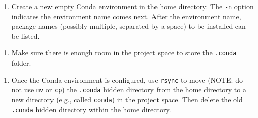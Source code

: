 \documentclass[
]{book}
\newenvironment{Shaded}{\begin{snugshade}}{\end{snugshade}}
\newcommand{\CommentTok}[1]{\textcolor[rgb]{0.56,0.35,0.01}{\textit{#1}}}
\newcommand{\DecValTok}[1]{\textcolor[rgb]{0.00,0.00,0.81}{#1}}
\newcommand{\ErrorTok}[1]{\textcolor[rgb]{0.64,0.00,0.00}{\textbf{#1}}}
\newcommand{\NormalTok}[1]{#1}
\newcommand{\OperatorTok}[1]{\textcolor[rgb]{0.81,0.36,0.00}{\textbf{#1}}}
\newcommand{\StringTok}[1]{\textcolor[rgb]{0.31,0.60,0.02}{#1}}
\providecommand{\tightlist}{%
  \setlength{\itemsep}{0pt}\setlength{\parskip}{0pt}}
\begin{document}
\begin{Shaded}
\end{Shaded}

\begin{enumerate}
\def\labelenumi{\arabic{enumi}.}
\setcounter{enumi}{2}
\tightlist
\item
  Create a new empty Conda environment in the home directory. The \texttt{-n} option indicates the environment name comes next. After the environment name, package names (possibly multiple, separated by a space) to be installed can be listed.
\end{enumerate}

\begin{Shaded}
\end{Shaded}

\begin{enumerate}
\def\labelenumi{\arabic{enumi}.}
\setcounter{enumi}{3}
\tightlist
\item
  Make sure there is enough room in the project space to store the \texttt{.conda} folder.
\end{enumerate}

\begin{Shaded}
\end{Shaded}

\begin{enumerate}
\def\labelenumi{\arabic{enumi}.}
\setcounter{enumi}{4}
\tightlist
\item
  Once the Conda environment is configured, use \texttt{rsync} to move (NOTE: do not use \texttt{mv} or \texttt{cp}) the \texttt{.conda} hidden directory from the home directory to a new directory (e.g., called \texttt{conda}) in the project space. Then delete the old \texttt{.conda} hidden directory within the home directory.
\end{enumerate}
\end{document}
